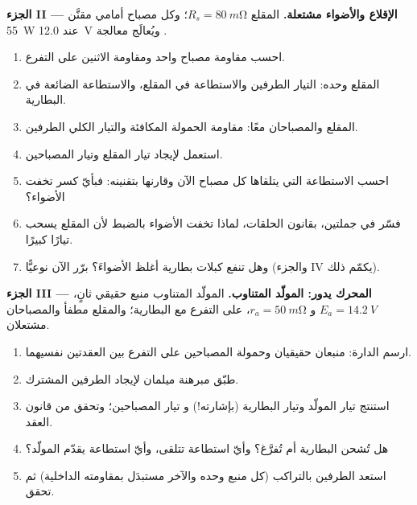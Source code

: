 \begin{problem}
\medskip
\noindent\textbf{الجزء II --- الإقلاع والأضواء مشتعلة.}
المقلع  $R_s = \qty{80}{m\ohm}$؛ وكل مصباح أمامي
مقنَّن \qty{55}{W} عند \qty{12.0}{V} ويُعالَج معالجة .
\begin{enumerate}[resume]
  \item احسب مقاومة مصباح واحد ومقاومة الاثنين على
        التفرع.
  \item المقلع وحده: التيار  الطرفين والاستطاعة في المقلع،
        والاستطاعة الضائعة في البطارية.
  \item المقلع والمصباحان معًا: مقاومة الحمولة
        المكافئة والتيار الكلي  الطرفين.
  \item استعمل  لإيجاد تيار المقلع
        وتيار المصباحين.
  \item احسب الاستطاعة التي يتلقاها كل مصباح الآن وقارنها
        بتقنينه: فبأيّ كسر تخفت الأضواء؟
  \item فسّر في جملتين، بقانون الحلقات، لماذا تخفت الأضواء
        بالضبط لأن المقلع يسحب تيارًا كبيرًا.
  \item وهل تنفع كبلات بطارية أغلظ الأضواءَ؟ برّر
        الآن نوعيًّا (والجزء IV يكمّم ذلك).
\end{enumerate}

\medskip
\noindent\textbf{الجزء III --- المحرك يدور: المولّد المتناوب.}
المولّد المتناوب منبع حقيقي ثانٍ، $E_a = \qty{14.2}{V}$ و
$r_a = \qty{50}{m\ohm}$، على التفرع مع البطارية؛ والمقلع
مطفأ والمصباحان مشتعلان.
\begin{enumerate}[resume]
  \item ارسم الدارة: منبعان حقيقيان وحمولة المصباحين على
        التفرع بين العقدتين نفسيهما.
  \item طبّق مبرهنة ميلمان لإيجاد  الطرفين المشترك.
  \item استنتج تيار المولّد وتيار البطارية (بإشارته!) و
        تيار المصباحين؛ وتحقق من قانون العقد.
  \item هل تُشحن البطارية أم تُفرَّغ؟ وأيّ استطاعة تتلقى،
        وأيّ استطاعة يقدّم المولّد؟
  \item استعد  الطرفين بالتراكب (كل منبع
        وحده والآخر مستبدَل بمقاومته الداخلية) ثم
        تحقق.
\end{enumerate}


\end{problem}

